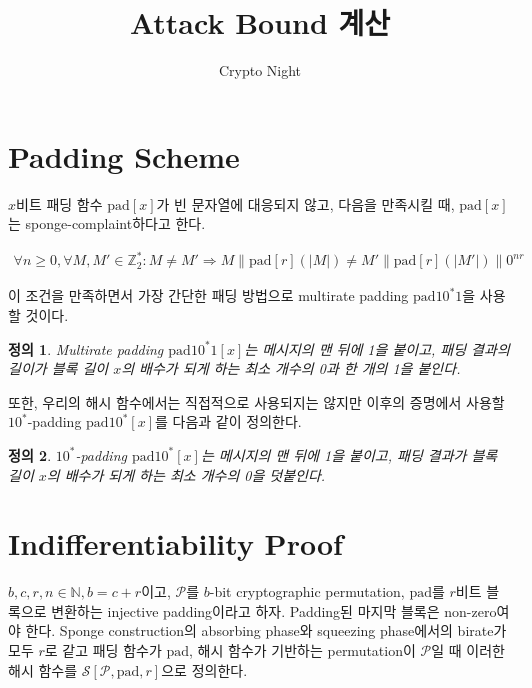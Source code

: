 \documentclass{article}
\title{Attack Bound 계산}
\author{Crypto Night}
\newtheorem{definition}{정의}
\begin{document}
  \maketitle

  \section{Padding Scheme}
  \(x\)비트 패딩 함수 \(\mathrm{pad}[x]\)가 빈 문자열에 대응되지 않고, 다음을 만족시킬 때, \(\mathrm{pad}[x]\)는 sponge-complaint하다고 한다.\cite{guido_cryptographic_2011}

  \begin{align*}
    \forall n \geq 0, \forall M, M' \in \mathbb{Z}^*_2 : M \not=M' \Rightarrow M \| \mathrm{pad}[r](|M|) \not= M' \| \mathrm{pad}[r](|M'|) \| 0^{nr}
  \end{align*}

  이 조건을 만족하면서 가장 간단한 패딩 방법으로 multirate padding \(\mathrm{pad10^*1}\)을 사용할 것이다.

  \begin{definition}
    Multirate padding \(\mathrm{pad10^*1}[x]\)는 메시지의 맨 뒤에 1을 붙이고, 패딩 결과의 길이가 블록 길이 \(x\)의 배수가 되게 하는 최소 개수의 0과 한 개의 1을 붙인다.
  \end{definition}

  또한, 우리의 해시 함수에서는 직접적으로 사용되지는 않지만 이후의 증명에서 사용할 \(10^*\)-padding \(\mathrm{pad10^*}[x]\)를 다음과 같이 정의한다.

  \begin{definition}
    \(10^*\)-padding \(\mathrm{pad10^*}[x]\)는 메시지의 맨 뒤에 1을 붙이고, 패딩 결과가 블록 길이 \(x\)의 배수가 되게 하는 최소 개수의 0을 덧붙인다.
  \end{definition}

  \section{Indifferentiability Proof}
  \(b, c, r, n \in \mathbb{N}, b = c + r\)이고, \(\mathcal{P}\)를 \(b\)-bit cryptographic permutation, \(\mathrm{pad}\)를 \(r\)비트 블록으로 변환하는 injective padding이라고 하자. Padding된 마지막 블록은 non-zero여야 한다. Sponge construction의 absorbing phase와 squeezing phase에서의 birate가 모두 \(r\)로 같고 패딩 함수가 \(\mathrm{pad}\), 해시 함수가 기반하는 permutation이 \(\mathcal{P}\)일 때 이러한 해시 함수를 \(\mathcal{S}[\mathcal{P}, \mathrm{pad}, r]\)으로 정의한다.
\end{document}
